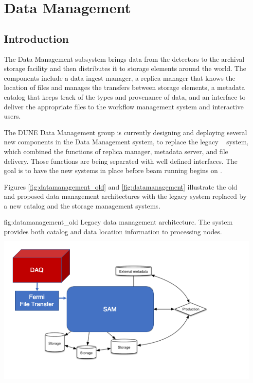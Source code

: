 \documentclass[../main-v1.tex]{subfiles}
\begin{document}
\chapter{Data Management  }
\label{ch:datamgmt}

\section{Introduction }
\label{sec:datamgmt:xyz}  %

The Data Management subsystem brings data from the detectors to the archival storage facility 
and then distributes it to storage elements around the world.  The components include a data ingest manager, a replica manager that knows the location of files and manages the transfers between storage elements, a metadata catalog that keeps track of the types and provenance of data, and an interface to deliver the appropriate files to the workflow management system and interactive users.

The DUNE Data Management group is currently designing and deploying several new components in the Data Management
system, to replace the legacy ~\cite{Illingworth:2014mba} system, which combined the functions of replica manager, metadata server, 
and file delivery.  Those functions are being separated with well defined interfaces.  The goal is to have the new systems in place before beam running begins on . %

Figures \ref{fig:datamanagement_old} and \ref{fig:datamanagement} illustrate the old and proposed data management architectures with the legacy  system replaced by a new catalog and the  storage management systems. 

\begin{dunefigure}
{fig:datamanagement_old} 
{Legacy  data management architecture.  The  system provides both catalog and data location information to processing nodes.}
\includegraphics[height=8cm]{graphics/DataManagement/data_mgmt_figures_old.png}
\end{dunefigure}
\end{document}
